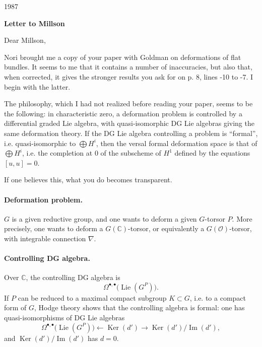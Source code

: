 \documentclass[11pt]{article}
\newcommand{\bbC}{\mathbb{C}}
\newcommand{\Lie}{\operatorname{Lie}}
\newcommand{\Ker}{\operatorname{Ker}}
\newcommand{\Imop}{\operatorname{Im}}
\begin{document}
\begin{flushleft}
1987
\end{flushleft}

\begin{center}
\textbf{Letter to Millson}
\end{center}

Dear Millson,

Nori brought me a copy of your paper with Goldman on deformations of flat bundles. It seems to me that it contains a number of inaccuracies, but also that, when corrected, it gives the stronger results you ask for on p. 8, lines -10 to -7. I begin with the latter.

The philosophy, which I had not realized before reading your paper, seems to be the following: in characteristic zero, a deformation problem is controlled by a differential graded Lie algebra, with quasi-isomorphic DG Lie algebras giving the same deformation theory. If the DG Lie algebra controlling a problem is ``formal'', i.e. quasi-isomorphic to $\bigoplus H^i$, then the versal formal deformation space is that of $\bigoplus H^i$, i.e. the completion at $0$ of the subscheme of $H^1$ defined by the equations $[u,u]=0$.

If one believes this, what you do becomes transparent.

\paragraph{Deformation problem.}
$G$ is a given reductive group, and one wants to deform a given $G$-torsor $P$. More precisely, one wants to deform a $G(\bbC)$-torsor, or equivalently a $G(\mathcal{O})$-torsor, with integrable connection $\nabla$.

\paragraph{Controlling DG algebra.}
Over $\bbC$, the controlling DG algebra is
\[
  \Omega^{\bullet,\bullet}\bigl(\Lie(G^P)\bigr).
\]
If $P$ can be reduced to a maximal compact subgroup $K\subset G$, i.e. to a compact form of $G$, Hodge theory shows that the controlling algebra is formal: one has quasi-isomorphisms of DG Lie algebras
\begin{equation}\label{eq:quasi}
  \Omega^{\bullet,\bullet}\bigl(\Lie(G^P)\bigr)
  \longleftarrow
  \Ker(d')
  \longrightarrow
  \Ker(d')/\Imop(d'),
\end{equation}
and $\Ker(d')/\Imop(d')$ has $d=0$.
\end{document}
